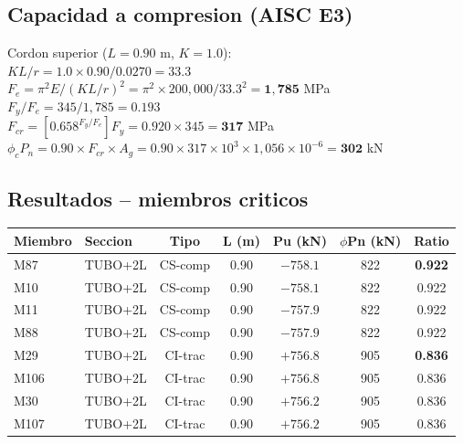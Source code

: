 \documentclass[12pt,a4paper]{article}
\newcommand{\tableheadrow}{\rowcolor{primary!15}\sffamily\footnotesize\bfseries\color{primary}}
\begin{document}
\subsection{Capacidad a compresion (AISC E3)}
{\sffamily\small
Cordon superior ($L=0.90$ m, $K=1.0$):
\\[2pt]
$KL/r = 1.0 \times 0.90 / 0.0270 = 33.3$ \\
$F_e = \pi^2 E / (KL/r)^2 = \pi^2 \times 200{,}000 / 33.3^2 = \mathbf{1{,}785}$ MPa \\
$F_y / F_e = 345 / 1{,}785 = 0.193$ \\
$F_{cr} = \left[0.658^{F_y/F_e}\right] F_y = 0.920 \times 345 = \mathbf{317}$ MPa \\
$\phi_c P_n = 0.90 \times F_{cr} \times A_g = 0.90 \times 317{\times}10^3 \times 1{,}056{\times}10^{-6} = \mathbf{302}$ kN
}

\subsection{Resultados -- miembros criticos}
\begin{center}
\begin{tabular}{l l c c c c c}
\toprule
\tableheadrow
\textbf{Miembro} & \textbf{Seccion} & \textbf{Tipo} & \textbf{L (m)} & \textbf{Pu (kN)} & \textbf{$\phi$Pn (kN)} & \textbf{Ratio} \\
\midrule
M87  & TUBO+2L & CS-comp & 0.90 & $-758.1$ & 822 & \textbf{0.922} \\
M10  & TUBO+2L & CS-comp & 0.90 & $-758.1$ & 822 & 0.922 \\
M11  & TUBO+2L & CS-comp & 0.90 & $-757.9$ & 822 & 0.922 \\
M88  & TUBO+2L & CS-comp & 0.90 & $-757.9$ & 822 & 0.922 \\
\rowcolor{tablerow}
M29  & TUBO+2L & CI-trac & 0.90 & $+756.8$ & 905 & \textbf{0.836} \\
M106 & TUBO+2L & CI-trac & 0.90 & $+756.8$ & 905 & 0.836 \\
M30  & TUBO+2L & CI-trac & 0.90 & $+756.2$ & 905 & 0.836 \\
M107 & TUBO+2L & CI-trac & 0.90 & $+756.2$ & 905 & 0.836 \\
\bottomrule
\end{tabular}
\end{center}
\end{document}
